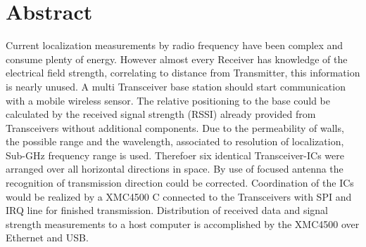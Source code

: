 \newpage
\chapter*{Abstract}
\label{sec:abstract}
\pagestyle{scrheadings}

Current localization measurements  by radio frequency have been complex and consume plenty of energy. However almost every Receiver has knowledge of the electrical field strength, correlating to distance from Transmitter, this information is nearly unused. A multi Transceiver base station should start communication with a mobile wireless sensor. The relative positioning to the base could be calculated by the received signal strength (RSSI) already provided from Transceivers without additional components. Due to the permeability of walls, the possible range and the wavelength, associated to resolution of localization,   Sub-GHz frequency range is used.  Therefoer six identical Transceiver-ICs were arranged over all horizontal directions in space. By use of focused antenna the recognition of transmission direction could be corrected. Coordination of the ICs would be realized by a XMC4500 \textmu C connected to the Transceivers with SPI and IRQ line for finished transmission. Distribution of received data and signal strength measurements to a host computer is accomplished by the XMC4500 over Ethernet and USB.